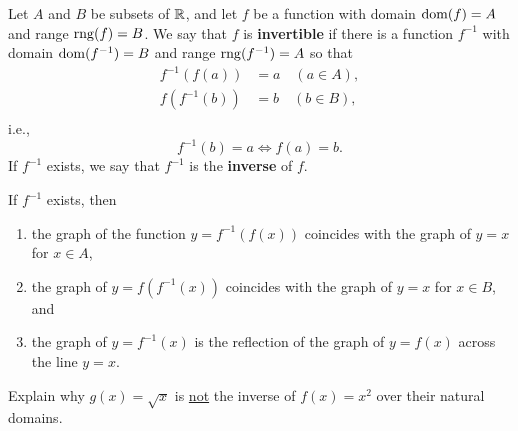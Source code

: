 \setcounter{chapter}{7}
\setcounter{section}{1}
\setcounter{theorem}{0}
\setcounter{equation}{0}


\begin{definition}
Let $A$ and $B$ be subsets of $\mathbb R$, and let $f$ be a function with domain $\mathrm{dom}(f)=A$ and range $\mathrm{rng}(f)=B$.
We say that $f$ is \textbf{invertible} if there is a function $f^{-1}$ with domain $\mathrm{dom}(f^{-1})=B$ and range $\mathrm{rng}(f^{-1})=A$ so that
\begin{align*}
f^{-1}(f(a)) &= a\quad (a\in A),\\
f(f^{-1}(b)) &= b\quad (b\in B),\\
\end{align*}
i.e.,
\begin{equation*}
f^{-1}(b)=a \iff f(a)=b.
\end{equation*}
If $f^{-1}$ exists, we say that $f^{-1}$ is the \textbf{inverse} of $f$.
\end{definition}

\begin{remark}
If $f^{-1}$ exists, then
\begin{enumerate}
\item the graph of the function $y=f^{-1}(f(x))$ coincides with the graph of $y=x$ for $x\in A$, 
\item the graph of $y=f(f^{-1}(x))$ coincides with the graph of $y=x$ for $x\in B$, and
\item the graph of $y=f^{-1}(x)$ is the reflection of the graph of $y=f(x)$ across the line $y=x$.
\end{enumerate}
\end{remark}

\begin{example}
Explain why $g(x) = \sqrt x$ is \underline{not} the inverse of $f(x)=x^2$ over their natural domains.
\end{example}

